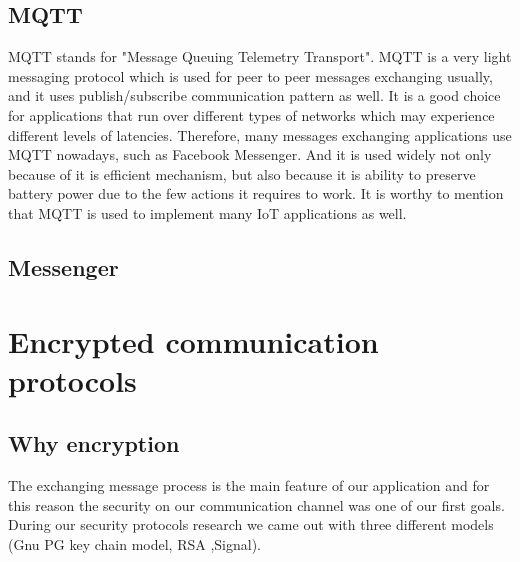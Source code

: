\documentclass[11pt,a4paper]{report}
\begin{document}
\subsection{MQTT}
MQTT stands for "Message Queuing Telemetry Transport". MQTT is a very light messaging protocol which is used for peer to peer messages exchanging usually, and it uses publish/subscribe communication pattern as well. It is a good choice for applications that run over different types of networks which may experience different levels of latencies. Therefore, many messages exchanging applications use MQTT nowadays, such as Facebook Messenger. And it is used widely not only because of it is efficient mechanism, but also because it is ability to preserve battery power due to the few actions it requires to work. It is worthy to mention that MQTT is used to implement many IoT applications as well.

\subsection{Messenger}

\section{Encrypted communication protocols}

\subsection{Why encryption}
The exchanging message process is the main feature of our application and for this reason the security on our communication channel was one of our first goals. During our security protocols research we came out with three different models (Gnu PG key chain model, RSA ,Signal).
\end{document}
